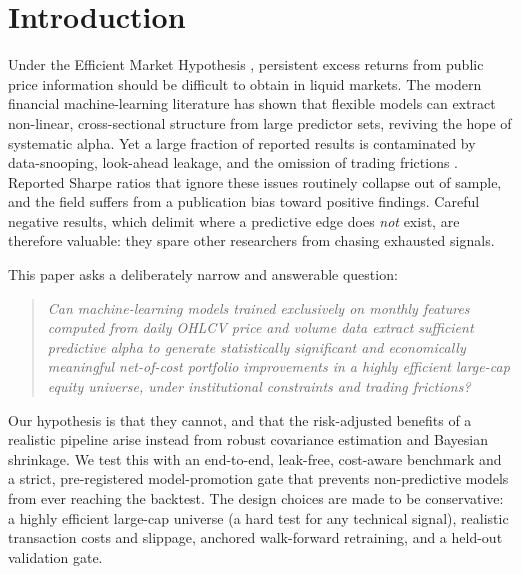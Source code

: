 \documentclass[11pt]{article}
\begin{document}
\section{Introduction}
Under the Efficient Market Hypothesis \citep{fama1970efficient}, persistent excess returns from
public price information should be difficult to obtain in liquid markets. The modern financial
machine-learning literature \citep{gu2020empirical} has shown that flexible models can extract
non-linear, cross-sectional structure from large predictor sets, reviving the hope of systematic
alpha. Yet a large fraction of reported results is contaminated by data-snooping, look-ahead
leakage, and the omission of trading frictions \citep{lopezdeprado2018advances}. Reported Sharpe
ratios that ignore these issues routinely collapse out of sample, and the field suffers from a
publication bias toward positive findings. Careful negative results, which delimit where a
predictive edge does \emph{not} exist, are therefore valuable: they spare other researchers from
chasing exhausted signals.

This paper asks a deliberately narrow and answerable question:

\begin{quote}
\emph{Can machine-learning models trained exclusively on monthly features computed from daily
OHLCV price and volume data extract sufficient predictive alpha to generate statistically
significant and economically meaningful net-of-cost portfolio improvements in a highly efficient
large-cap equity universe, under institutional constraints and trading frictions?}
\end{quote}

Our hypothesis is that they cannot, and that the risk-adjusted benefits of a realistic pipeline
arise instead from robust covariance estimation and Bayesian shrinkage. We test this with an
end-to-end, leak-free, cost-aware benchmark and a strict, pre-registered model-promotion gate
that prevents non-predictive models from ever reaching the backtest. The design choices are made
to be conservative: a highly efficient large-cap universe (a hard test for any technical signal),
realistic transaction costs and slippage, anchored walk-forward retraining, and a held-out
validation gate.
\end{document}

